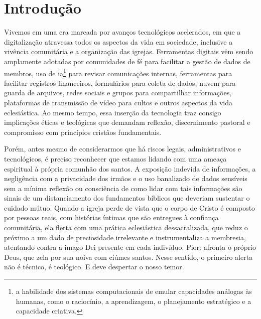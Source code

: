 \newcommand{\tituloIntroducao}{Introdução}

\chapter*{\tituloIntroducao}
\addcontentsline{toc}{section}{\MakeUppercase{\tituloIntroducao}}

Vivemos em uma era marcada por avanços tecnológicos acelerados, em que a digitalização atravessa todos os aspectos da vida em sociedade, inclusive a vivência comunitária e a organização das igrejas. Ferramentas digitais vêm sendo amplamente adotadas por comunidades de fé para facilitar a gestão de dados de membros, uso de \gls{ia}\footnote{a habilidade dos sistemas computacionais de emular capacidades análogas às humanas, como o raciocínio, a aprendizagem, o planejamento estratégico e a capacidade criativa.} para revisar comunicações internas, ferramentas para facilitar registros financeiros, formulários para coleta de dados, nuvem para guarda de arquivos, redes sociais e grupos para compartilhar informações, plataformas de transmissão de vídeo para cultos e outros aspectos da vida eclesiástica. Ao mesmo tempo, essa inserção da tecnologia traz consigo implicações éticas e teológicas que demandam reflexão, discernimento pastoral e compromisso com princípios cristãos fundamentais.

Porém, antes mesmo de considerarmos que há riscos legais, administrativos e tecnológicos, é preciso reconhecer que estamos lidando com uma ameaça espiritual à própria comunhão dos santos. A exposição indevida de informações, a negligência com a privacidade dos irmãos e o uso banalizado de dados sensíveis sem a mínima reflexão ou consciência de como lidar com tais informações são sinais de um distanciamento dos fundamentos bíblicos que deveriam sustentar o cuidado mútuo. Quando a igreja perde de vista que o corpo de Cristo é composto por pessoas reais, com histórias íntimas que são entregues à confiança comunitária, ela flerta com uma prática eclesiástica dessacralizada, que reduz o próximo a um dado de preciosidade irrelevante e instrumentaliza a membresia, atentando contra a imago Dei presente em cada indivíduo. Pior: afronta o próprio Deus, que zela por sua noiva com ciúmes santos. Nesse sentido, o primeiro alerta não é técnico, é teológico. E deve despertar o nosso temor.

